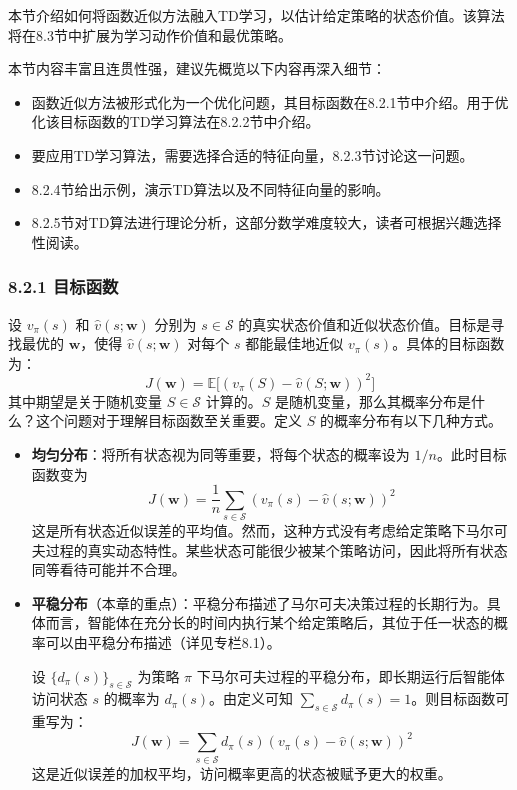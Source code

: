 \documentclass[UTF8]{article}
\begin{document}
本节介绍如何将函数近似方法融入TD学习，以估计给定策略的状态价值。该算法将在8.3节中扩展为学习动作价值和最优策略。

本节内容丰富且连贯性强，建议先概览以下内容再深入细节：

\begin{itemize}
    \item 函数近似方法被形式化为一个优化问题，其目标函数在8.2.1节中介绍。用于优化该目标函数的TD学习算法在8.2.2节中介绍。
    \item 要应用TD学习算法，需要选择合适的特征向量，8.2.3节讨论这一问题。
    \item 8.2.4节给出示例，演示TD算法以及不同特征向量的影响。
    \item 8.2.5节对TD算法进行理论分析，这部分数学难度较大，读者可根据兴趣选择性阅读。
\end{itemize}

\subsubsection*{8.2.1 目标函数}

设 $v_\pi(s)$ 和 $\hat{v}(s; \boldsymbol{w})$ 分别为 $s \in \mathcal{S}$ 的真实状态价值和近似状态价值。目标是寻找最优的 $\boldsymbol{w}$，使得 $\hat{v}(s; \boldsymbol{w})$ 对每个 $s$ 都能最佳地近似 $v_\pi(s)$。具体的目标函数为：
\begin{equation}
\label{eq:J_obj}
J(\boldsymbol{w}) = \mathbb{E}\big[ (v_\pi(S) - \hat{v}(S; \boldsymbol{w}))^2 \big]
\end{equation}
其中期望是关于随机变量 $S \in \mathcal{S}$ 计算的。$S$ 是随机变量，那么其概率分布是什么？这个问题对于理解目标函数至关重要。定义 $S$ 的概率分布有以下几种方式。

\begin{itemize}
    \item \textbf{均匀分布}：将所有状态视为同等重要，将每个状态的概率设为 $1/n$。此时目标函数变为
    \[
    J(\boldsymbol{w}) = \frac{1}{n}\sum_{s \in \mathcal{S}}(v_\pi(s) - \hat{v}(s; \boldsymbol{w}))^2
    \]
    这是所有状态近似误差的平均值。然而，这种方式没有考虑给定策略下马尔可夫过程的真实动态特性。某些状态可能很少被某个策略访问，因此将所有状态同等看待可能并不合理。
    
    \item \textbf{平稳分布}（本章的重点）：平稳分布描述了马尔可夫决策过程的长期行为。具体而言，智能体在充分长的时间内执行某个给定策略后，其位于任一状态的概率可以由平稳分布描述（详见专栏8.1）。
    
    设 $\{d_\pi(s)\}_{s \in \mathcal{S}}$ 为策略 $\pi$ 下马尔可夫过程的平稳分布，即长期运行后智能体访问状态 $s$ 的概率为 $d_\pi(s)$。由定义可知 $\sum_{s \in \mathcal{S}} d_\pi(s) = 1$。则目标函数可重写为：
    \begin{equation}
    \label{eq:J_weighted}
    J(\boldsymbol{w}) = \sum_{s \in \mathcal{S}} d_\pi(s) (v_\pi(s) - \hat{v}(s; \boldsymbol{w}))^2
    \end{equation}
    这是近似误差的加权平均，访问概率更高的状态被赋予更大的权重。
\end{itemize}
\end{document}
